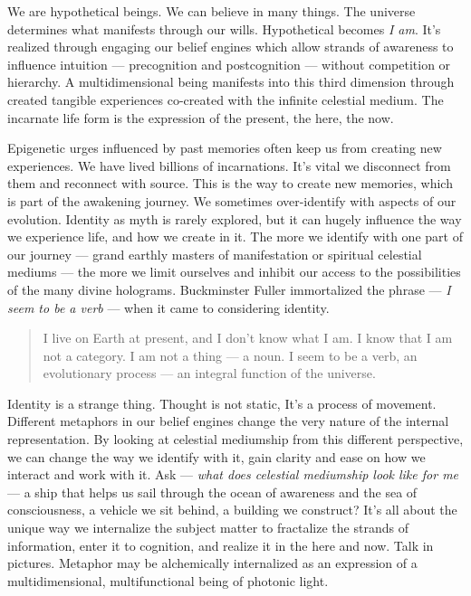 \documentclass[letterpaper,9pt,twoside,titlepage,onecolumn,openany]{book}
\begin{document}
We are hypothetical beings. We can believe in many things. The universe
determines what manifests through our wills. Hypothetical becomes
\emph{I am}. It's realized through engaging our belief engines which
allow strands of awareness to influence intuition --- precognition and
postcognition --- without competition or hierarchy. A multidimensional
being manifests into this third dimension through created tangible
experiences co-created with the infinite celestial medium. The incarnate
life form is the expression of the present, the here, the now.

Epigenetic urges influenced by past memories often keep us from creating
new experiences. We have lived billions of incarnations. It's vital we
disconnect from them and reconnect with source. This is the way to
create new memories, which is part of the awakening journey. We
sometimes over-identify with aspects of our evolution. Identity as myth
is rarely explored, but it can hugely influence the way we experience
life, and how we create in it. The more we identify with one part of our
journey --- grand earthly masters of manifestation or spiritual
celestial mediums --- the more we limit ourselves and inhibit our access
to the possibilities of the many divine holograms. Buckminster Fuller
immortalized the phrase --- \emph{I seem to be a verb} --- when it came
to considering identity.

\begin{quote}
I live on Earth at present,
and I don't know what I am.
I know that I am not a category.
I am not a thing — a noun.
I seem to be a verb,
an evolutionary process — an integral function of the universe.
\end{quote}

Identity is a strange thing. Thought is not static, It's a process of
movement. Different metaphors in our belief engines change the very
nature of the internal representation. By looking at celestial
mediumship from this different perspective, we can change the way we
identify with it, gain clarity and ease on how we interact and work with
it. Ask --- \emph{what does celestial mediumship look like for me} --- a
ship that helps us sail through the ocean of awareness and the sea of
consciousness, a vehicle we sit behind, a building we construct? It's
all about the unique way we internalize the subject matter to fractalize
the strands of information, enter it to cognition, and realize it in the
here and now. Talk in pictures. Metaphor may be alchemically
internalized as an expression of a multidimensional, multifunctional
being of photonic light.
\end{document}
